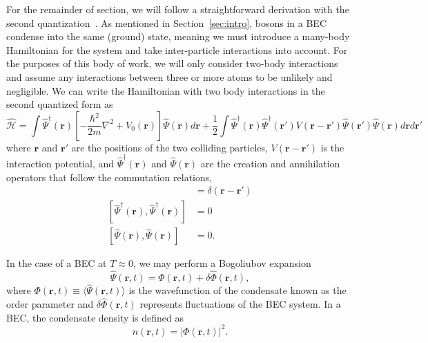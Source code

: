 For the remainder of section, we will follow a straightforward derivation with the second quantization~\cite{aversa2008}.
As mentioned in Section~\ref{sec:intro}, bosons in a BEC condense into the same (ground) state, meaning we must introduce a many-body Hamiltonian for the system and take inter-particle interactions into account.
For the purposes of this body of work, we will only consider two-body interactions and assume any interactions between three or more atoms to be unlikely and negligible.
We can write the Hamiltonian with two body interactions in the second quantized form as
\begin{equation}
    \mathcal{\hat H} = \int \hat \Psi^\dagger(\mathbf{r})\left[-\frac{\hbar^2}{2m}\nabla^2 + V_0(\mathbf{r}) \right]\hat \Psi(\mathbf{r}) d\mathbf{r} + \frac{1}{2} \int  \hat \Psi^\dagger(\mathbf{r}) \hat \Psi^\dagger(\mathbf{r'}) V(\mathbf{r} - \mathbf{r'})\hat \Psi(\mathbf{r'}) \hat \Psi(\mathbf{r}) d\mathbf{r} d\mathbf{r'}
    \label{eqn:2nd}
\end{equation}
where $\mathbf{r}$ and $\mathbf{r'}$ are the positions of the two colliding particles, $V(\mathbf{r}-\mathbf{r'})$ is the interaction potential, and $\hat \Psi^\dagger(\mathbf{r})$ and $\hat \Psi(\mathbf{r})$ are the creation and annihilation operators that follow the commutation relations,
\begin{align}
 [\hat \Psi(\mathbf{r}),\hat \Psi^\dagger(\mathbf{r})] &= \delta(\mathbf{r} - \mathbf{r'}) \\
 [\hat \Psi^\dagger(\mathbf{r}),\hat \Psi^\dagger(\mathbf{r})] &= 0 \\
 [\hat \Psi(\mathbf{r}),\hat \Psi(\mathbf{r})] &= 0.
\end{align}

In the case of a BEC at $T\approx0$, we may perform a Bogoliubov expansion~\cite{bogoliubov1947, dalfovo1999}
\begin{equation}
    \hat \Psi (\mathbf{r}, t) = \Phi(\mathbf{r},t) + \delta \hat \Phi(\mathbf{r},t),
\label{eqn:bog}
\end{equation}
where $\Phi(\mathbf{r},t) \equiv \langle \hat \Psi(\mathbf{r},t) \rangle$ is the wavefunction of the condensate known as the order parameter and $\delta \hat \Phi(\mathbf{r},t)$ represents fluctuations of the BEC system.
In a BEC, the condensate density is defined as
\begin{equation}
    n(\mathbf{r},t) = |\Phi(\mathbf{r},t)|^2.
\end{equation}

